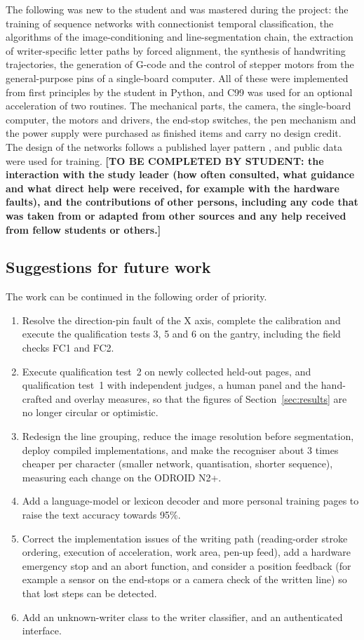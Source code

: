 The following was new to the student and was mastered during the project: the training of sequence networks with connectionist temporal classification, the algorithms of the image-conditioning and line-segmentation chain, the extraction of writer-specific letter paths by forced alignment, the synthesis of handwriting trajectories, the generation of G-code and the control of stepper motors from the general-purpose pins of a single-board computer.
All of these were implemented from first principles by the student in Python, and C99 was used for an optional acceleration of two routines.
The mechanical parts, the camera, the single-board computer, the motors and drivers, the end-stop switches, the pen mechanism and the power supply were purchased as finished items and carry no design credit.
The design of the networks follows a published layer pattern \cite{kizilirmak2023}, and public data were used for training.
\textbf{[TO BE COMPLETED BY STUDENT: the interaction with the study leader (how often consulted, what guidance and what direct help were received, for example with the hardware faults), and the contributions of other persons, including any code that was taken from or adapted from other sources and any help received from fellow students or others.]}

\subsection{Suggestions for future work}
\label{sec:con-future}

The work can be continued in the following order of priority.
\begin{enumerate}
  \item Resolve the direction-pin fault of the X axis, complete the calibration and execute the qualification tests 3, 5 and 6 on the gantry, including the field checks FC1 and FC2.
  \item Execute qualification test~2 on newly collected held-out pages, and qualification test~1 with independent judges, a human panel and the hand-crafted and overlay measures, so that the figures of Section~\ref{sec:results} are no longer circular or optimistic.
  \item Redesign the line grouping, reduce the image resolution before segmentation, deploy compiled implementations, and make the recogniser about 3 times cheaper per character (smaller network, quantisation, shorter sequence), measuring each change on the ODROID N2+.
  \item Add a language-model or lexicon decoder and more personal training pages to raise the text accuracy towards 95\%.
  \item Correct the implementation issues of the writing path (reading-order stroke ordering, execution of acceleration, work area, pen-up feed), add a hardware emergency stop and an abort function, and consider a position feedback (for example a sensor on the end-stops or a camera check of the written line) so that lost steps can be detected.
  \item Add an unknown-writer class to the writer classifier, and an authenticated interface.
\end{enumerate}
